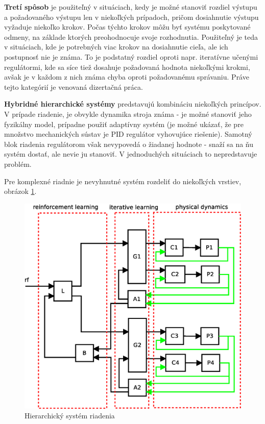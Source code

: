 {\bf Tretí spôsob} je použiteľný v situáciach, kedy je možné stanoviť rozdiel
výstupu a požadovaného výstupu len v niekoľkých prípadoch, pričom dosiahnutie
výstupu vyžaduje niekoľko krokov. Počas týchto krokov môžu byť systému
poskytované odmeny, na základe ktorých preohodnocuje svoje rozhodnutia.
Použiteľný je teda v situáciach, kde je potrebných viac krokov na dosiahnutie cieľa,
ale ich postupnosť nie je známa. To je podstatný rozdiel oproti napr.
iteratívne učenými regulátormi, kde sa síce tiež dosahuje požadovaná hodnota niekoľkými krokmi, avšak je v každom z nich známa
chyba oproti požadovanému správaniu.
Práve tejto kategórií je venovaná dizertačná práca.

{\bf Hybridné hierarchické systémy} predstavujú kombináciu niekoľkých princípov.
V prípade riadenie, je obvykle dynamika stroja známa - je možné stanoviť jeho fyzikálny model,
prípadne použiť adaptívny systém (je možné ukázať, že pre množstvo mechanických sústav je PID
regulátor vyhovujúce riešenie). Samotný blok riadenia regulátorom však nevypovedá o žiadanej hodnote -
snaží sa na ňu systém dostať, ale nevie ju stanoviť. V jednoduchých situáciach to nepredstavuje problém.

Pre komplexné riadnie je nevyhnutné systém rozdeliť do niekoľkých vrstiev, obrázok \ref{img:hierachical_controll_system}.

\begin{figure}[!htb]
\center
\includegraphics[scale=.5]{../diagrams/hierachical_system.eps}
\caption{Hierarchický systém riadenia}
\label{img:hierachical_controll_system}
\end{figure}

